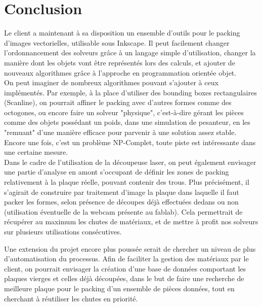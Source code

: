 \documentclass{style}
\begin{document}
\newpage
\section*{Conclusion}

 

Le client a maintenant à sa disposition un ensemble d'outils pour le packing d'images vectorielles, utilisable sous Inkscape. Il peut facilement changer l'ordonnancement des solveurs grâce à un langage simple d'utilisation, changer la manière dont les objets vont être représentés lors des calculs, et ajouter de nouveaux algorithmes grâce à l'approche en programmation orientée objet.\\

On peut imaginer de nombreux algorithmes pouvant s'ajouter à ceux implémentés. Par exemple, à la place d'utiliser des bounding boxes rectangulaires (Scanline), on pourrait affiner le packing avec d'autres formes comme des octogones, ou encore faire un solveur "physique", c'est-à-dire gérant les pièces comme des objets possédant un poids, dans une simulation de pesanteur, en les "remuant" d'une manière efficace pour parvenir à une solution assez stable. Encore une fois, c'est un problème NP-Complet, toute piste est intéressante dans une certaine mesure.\\

Dans le cadre de l'utilisation de la découpeuse laser, on peut également envisager une partie d'analyse en amont s'occupant de définir les zones de packing relativement à la plaque réelle, pouvant contenir des trous. Plus précisément, il s'agirait de construire par traitement d'image la plaque dans laquelle il faut packer les formes, selon présence de découpes déjà effectuées dedans ou non (utilisation éventuelle de la webcam présente au fablab). Cela permettrait de récupérer au maximum les chutes de matériaux, et de mettre à profit nos solveurs sur plusieurs utilisations consécutives. 

Une extension du projet encore plus poussée serait de chercher un niveau de plus d'automatisation du processus. Afin de faciliter la gestion des matériaux par le client, on pourrait envisager la création d'une base de données comportant les plaques vierges et celles déjà découpées, dans le but de faire une recherche de meilleure plaque pour le packing d'un ensemble de pièces données, tout en cherchant à réutiliser les chutes en priorité.\\
\end{document}
